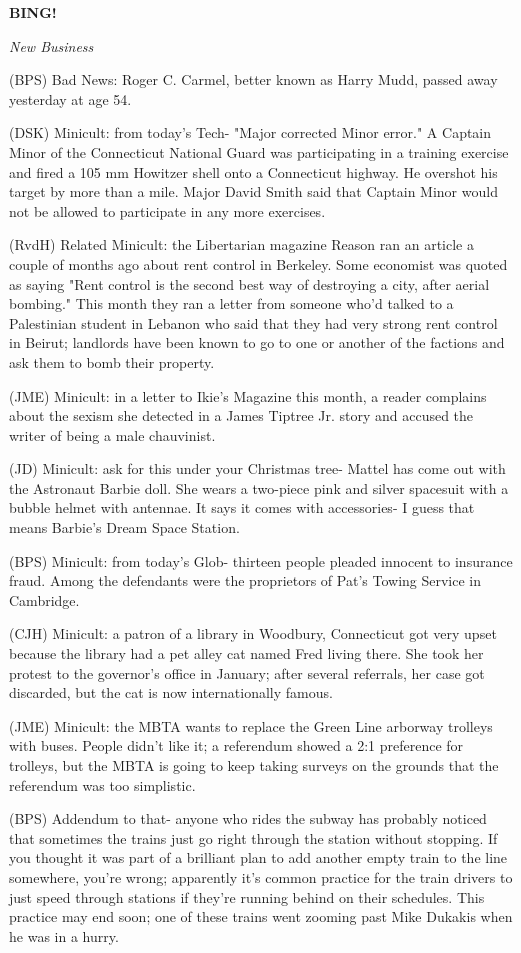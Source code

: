 \documentclass[12pt]{article}
\newcommand{\bing}{{\bf BING!} }
\newcommand{\goto}[1]{\bing \vskip 12pt \centerline{{\em{#1}}}}
\begin{document}
\goto{New Business}

(BPS) Bad News: Roger C. Carmel, better known as Harry Mudd, passed away yesterday at age 54.

(DSK) Minicult: from today's Tech- "Major corrected Minor error." A Captain Minor of the Connecticut National Guard was participating in a training exercise and fired a 105 mm Howitzer shell onto a Connecticut highway. He overshot his target by more than a mile. Major David Smith said that Captain Minor would not be allowed to participate in any more exercises.

(RvdH) Related Minicult: the Libertarian magazine Reason ran an article a couple of months ago about rent control in Berkeley. Some economist was quoted as saying "Rent control is the second best way of destroying a city, after aerial bombing." This month they ran a letter from someone who'd talked to a Palestinian student in Lebanon who said that they had very strong rent control in Beirut; landlords have been known to go to one or another of the factions and ask them to bomb their property.

(JME) Minicult: in a letter to Ikie's Magazine this month, a reader complains about the sexism she detected in a James Tiptree Jr. story and accused the writer of being a male chauvinist.

(JD) Minicult: ask for this under your Christmas tree- Mattel has come out with the Astronaut Barbie doll. She wears a two-piece pink and silver spacesuit with a bubble helmet with antennae. It says it comes with accessories- I guess that means Barbie's Dream Space Station.

(BPS) Minicult: from today's Glob- thirteen people pleaded innocent to insurance fraud. Among the defendants were the proprietors of Pat's Towing Service in Cambridge.

(CJH) Minicult: a patron of a library in Woodbury, Connecticut got very upset because the library had a pet alley cat named Fred living there. She took her protest to the governor's office in January; after several referrals, her case got discarded, but the cat is now internationally famous.

(JME) Minicult: the MBTA wants to replace the Green Line arborway trolleys with buses. People didn't like it; a referendum showed a 2:1 preference for trolleys, but the MBTA is going to keep taking surveys on the grounds that the referendum was too simplistic.

(BPS) Addendum to that- anyone who rides the subway has probably noticed that sometimes the trains just go right through the station without stopping. If you thought it was part of a brilliant plan to add another empty train to the line somewhere, you're wrong; apparently it's common practice for the train drivers to just speed through stations if they're running behind on their schedules. This practice may end soon; one of these trains went zooming past Mike Dukakis when he was in a hurry.
\end{document}
